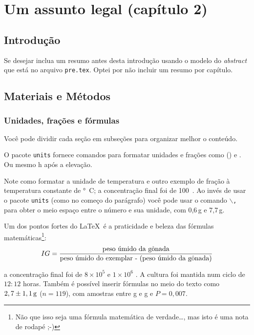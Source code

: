 \pagestyle{empty}
\cleardoublepage
\pagestyle{fancy}
\chapter{Um assunto legal (capítulo 2)}\label{cap2}

\section{Introdução}\label{cap2:intro}

Se desejar inclua um resumo antes desta introdução usando o modelo do \emph{abstract} que está no arquivo \texttt{pre.tex}.
Optei por não incluir um resumo por capítulo.

\section{Materiais e Métodos}\label{cap2:mem}

\subsection{Unidades, frações e fórmulas}\label{cap2:mem:unit}

Você pode dividir cada seção em subseções para organizar melhor o conteúdo.

O pacote \texttt{units} fornece comandos para formatar unidades e frações como  () e .
Ou mesmo \unit[7,5]{h} após a elevação.

Note como formatar a unidade de temperatura e outro exemplo de fração à temperatura constante de \unit[24]{°C}; a concentração final foi de 100~.
Ao invés de usar o pacote \texttt{units} (como no começo do parágrafo) você pode usar o comando \texttt{$\backslash$,} para obter o meio espaço entre o número e sua unidade, com 0,6\,g e 7,7\,g.

Um dos pontos fortes do \LaTeX\ é a praticidade e beleza das fórmulas matemáticas\footnote{Não que isso seja uma fórmula matemática de verdade\ldots, mas isto é uma nota de rodapé ;-)}:
\begin{equation}\label{eq:ind}\notag
IG=\frac{\text{peso úmido da gônada}}{\text{peso úmido do exemplar - (peso úmido da gônada)}}
\end{equation}

a concentração final foi de $8\times10^5$ e $1\times10^6$ .
A cultura foi mantida num ciclo de $12:12$ horas.
Também é possível inserir fórmulas no meio do texto como $2,7\pm\unit[1,1]{g}$ ($n=119$), com amostras entre \unit[0,6]{g} e \unit[7,7]{g} e $P=0,007$.


